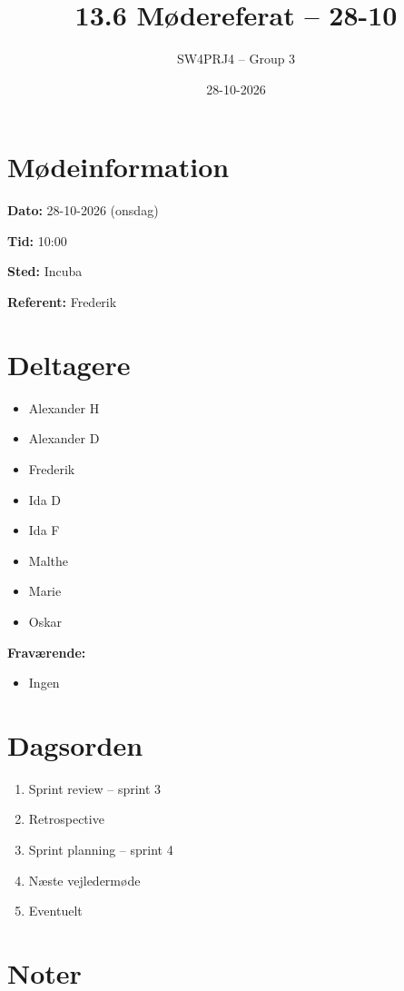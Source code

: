 \documentclass[a4paper,11pt]{article}
\title{13.6 Mødereferat -- 28-10}
\author{SW4PRJ4 -- Group 3}
\date{28-10-2026}
\begin{document}
\maketitle

\section*{Mødeinformation}

\textbf{Dato:} 28-10-2026 (onsdag)

\textbf{Tid:} 10:00

\textbf{Sted:} Incuba

\textbf{Referent:} Frederik

\section*{Deltagere}

\begin{itemize}
    \item Alexander H
    \item Alexander D
    \item Frederik
    \item Ida D
    \item Ida F
    \item Malthe
    \item Marie
    \item Oskar
\end{itemize}

\textbf{Fraværende:}

\begin{itemize}
    \item Ingen
\end{itemize}

\section*{Dagsorden}

\begin{enumerate}
    \item Sprint review -- sprint 3
    \item Retrospective
    \item Sprint planning -- sprint 4
    \item Næste vejledermøde
    \item Eventuelt
\end{enumerate}

\section*{Noter}
\end{document}
